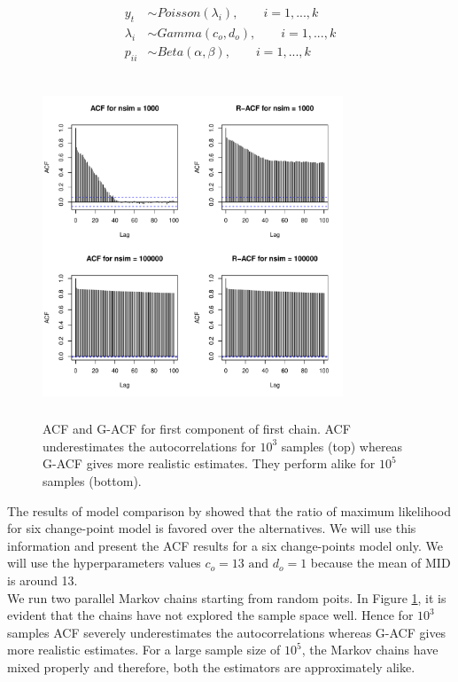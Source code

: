 \documentclass[11pt]{article}
\theoremstyle{remark}
\begin{document}
\begin{align*}
    y_t &\sim \textit{Poisson}(\lambda_i), \qquad i = 1, ..., k\\
    \lambda_i &\sim \textit{Gamma}(c_o, d_o), \qquad i = 1,..., k\\
    p_{ii} &\sim \textit{Beta}(\alpha, \beta), \qquad i = 1,..., k
\end{align*}
\begin{figure}[h]
    \centering
    \includegraphics[width = 0.8\textwidth, height = 4in]{plots/spatio-acf.pdf}
    \caption{ACF and G-ACF for first component of first chain. ACF underestimates the autocorrelations for $10^3$ samples (top) whereas G-ACF gives more realistic estimates. They perform alike for $10^5$ samples (bottom).}
    \label{fig:spatio-acf_G-fl}
\end{figure}
The results of model comparison by \cite{martin2011mcmcpack} showed that the ratio of maximum likelihood for six change-point model is favored over the alternatives. We will use this information and present the ACF results for a six change-points model only. We will use the hyperparameters values $c_o = 13 \textrm{ and } d_o = 1$ because the mean of MID is around 13. \\

We run two parallel Markov chains starting from random poits. In Figure \ref{fig:spatio-acf_G-fl}, it is evident that the chains have not explored the sample space well. Hence for $10^3$ samples ACF severely underestimates the autocorrelations whereas G-ACF gives more realistic estimates. For a large sample size of $10^5$, the Markov chains have mixed properly and therefore, both the estimators are approximately alike.
\end{document}
